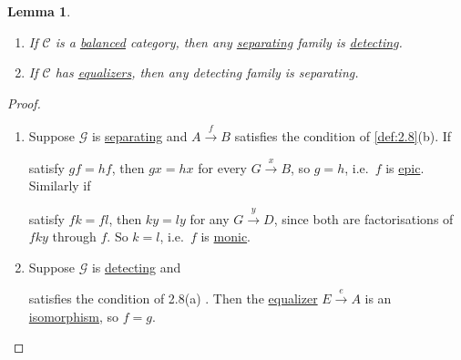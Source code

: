 \documentclass{article}
\newtheorem{nlemma}[nthm]{Lemma}
\begin{document}
\begin{nlemma}\label{lem:2.9}\leavevmode
  \begin{enumerate}[label=(\roman*)]
    \item If $\mathscr{C}$ is a \hyperlink{def:balanced}{balanced} category, then any \hyperlink{def:separating}{separating} family is \hyperlink{def:detecting}{detecting}.
    \item If $\mathscr{C}$ has \hyperlink{def:equalizer}{equalizers}, then any detecting family is separating.
  \end{enumerate}
\end{nlemma}
\begin{proof}\leavevmode
  \begin{enumerate}[label=(\roman*)]
    \item Suppose $\mathscr{G}$ is \hyperlink{def:separating}{separating} and $A \xrightarrow{f} B$ satisfies the condition of \cref{def:2.8}(b).
      If  satisfy $gf = hf$, then $gx = hx$ for every $G \xrightarrow{x} B$, so $g = h$, i.e.\ $f$ is \hyperlink{def:epic}{epic}.
      Similarly if
      satisfy $fk = fl$, then $ky = ly$ for any $G \xrightarrow{y} D$, since both are factorisations of $fky$ through $f$. So $k=l$, i.e.\ $f$ is \hyperlink{def:monic}{monic}.
    \item Suppose $\mathscr{G}$ is \hyperlink{def:detecting}{detecting} and  satisfies the condition of 2.8(a) .
      Then the \hyperlink{def:equalizer}{equalizer} $E \xrightarrow{e} A$ is an \hyperlink{def:iso}{isomorphism}, so $f = g$.
  \end{enumerate}
\end{proof}
\end{document}

